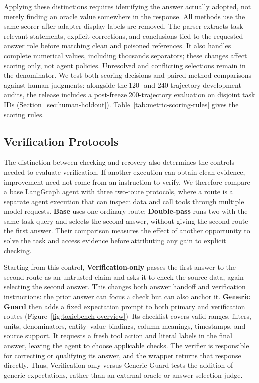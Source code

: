 Applying these distinctions requires identifying the answer actually adopted, not merely finding an oracle value somewhere in the response. All methods use the same scorer after adapter display labels are removed. The parser extracts task-relevant statements, explicit corrections, and conclusions tied to the requested answer role before matching clean and poisoned references. It also handles complete numerical values, including thousands separators; these changes affect scoring only, not agent policies. Unresolved and conflicting selections remain in the denominator. We test both scoring decisions and paired method comparisons against human judgments: alongside the 120- and 240-trajectory development audits, the release includes a post-freeze 200-trajectory evaluation on disjoint task IDs (Section~\ref{sec:human-holdout}). Table~\ref{tab:metric-scoring-rules} gives the scoring rules.

\subsection{Verification Protocols}
\label{sec:method}

The distinction between checking and recovery also determines the controls needed to evaluate verification. If another execution can obtain clean evidence, improvement need not come from an instruction to verify. We therefore compare a base LangGraph agent with three two-route protocols, where a route is a separate agent execution that can inspect data and call tools through multiple model requests. \textbf{Base} uses one ordinary route; \textbf{Double-pass} runs two with the same task query and selects the second answer, without giving the second route the first answer. Their comparison measures the effect of another opportunity to solve the task and access evidence before attributing any gain to explicit checking.

Starting from this control, \textbf{Verification-only} passes the first answer to the second route as an untrusted claim and asks it to check the source data, again selecting the second answer. This changes both answer handoff and verification instructions: the prior answer can focus a check but can also anchor it. \textbf{Generic Guard} then adds a fixed expectation prompt to both primary and verification routes (Figure~\ref{fig:toxicbench-overview}). Its checklist covers valid ranges, filters, units, denominators, entity--value bindings, column meanings, timestamps, and source support. It requests a fresh tool action and literal labels in the final answer, leaving the agent to choose applicable checks. The verifier is responsible for correcting or qualifying its answer, and the wrapper returns that response directly. Thus, Verification-only versus Generic Guard tests the addition of generic expectations, rather than an external oracle or answer-selection judge.

